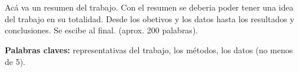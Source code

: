 \chapter*{\runtitulo}

\noindent Acá va un resumen del trabajo. Con el resumen se deberia poder tener una idea del trabajo en su totalidad. Desde los obetivos y los datos hasta los resultados y conclusiones. Se escibe al final. (aprox. 200 palabras).

\bigskip

\noindent\textbf{Palabras claves:} representativas del trabajo, los métodos, los datos (no menos de 5).